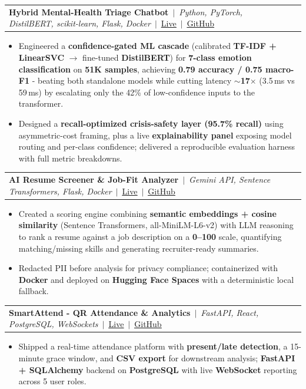 \documentclass[letterpaper,9pt]{article}
\makeatletter
\newcommand{\resumeItem}[1]{%
  \item\scriptsize{#1}%
}
\newcommand{\resumeProjectHeading}[1]{%
  \vspace{0pt}\item
  \begin{tabular*}{1.0\textwidth}{l@{\extracolsep{\fill}}r}
    \scriptsize #1\\
  \end{tabular*}\vspace{-3pt}%
}
\newcommand{\resumeItemListStart}{\begin{itemize}[leftmargin=0.15in,itemsep=1pt,topsep=1pt,parsep=0pt]}
\newcommand{\resumeItemListEnd}{\end{itemize}\vspace{0pt}}
\makeatother
\begin{document}
  \resumeProjectHeading
    {\textbf{Hybrid Mental-Health Triage Chatbot}~$|$~\emph{Python, PyTorch, DistilBERT, scikit-learn, Flask, Docker}~$|$~\href{https://hybrid-chatbot-o0s2.onrender.com}{\underline{Live}}~$|$~\href{https://github.com/afrin2315/hybrid_chatbot}{\underline{GitHub}}}
  \resumeItemListStart
    \resumeItem{Engineered a \textbf{confidence-gated ML cascade} (calibrated \textbf{TF-IDF + LinearSVC} $\rightarrow$ fine-tuned \textbf{DistilBERT}) for \textbf{7-class emotion classification} on \textbf{51K samples}, achieving \textbf{0.79 accuracy / 0.75 macro-F1} - beating both standalone models while cutting latency \textbf{$\sim$17$\times$} (3.5\,ms vs 59\,ms) by escalating only the 42\% of low-confidence inputs to the transformer.}
    \resumeItem{Designed a \textbf{recall-optimized crisis-safety layer (95.7\% recall)} using asymmetric-cost framing, plus a live \textbf{explainability panel} exposing model routing and per-class confidence; delivered a reproducible evaluation harness with full metric breakdowns.}
  \resumeItemListEnd

  \resumeProjectHeading
    {\textbf{AI Resume Screener \& Job-Fit Analyzer}~$|$~\emph{Gemini API, Sentence Transformers, Flask, Docker}~$|$~\href{https://huggingface.co/spaces/Afrin18/ai-resume-screener}{\underline{Live}}~$|$~\href{https://github.com/afrin2315/ai-resume-screener}{\underline{GitHub}}}
  \resumeItemListStart
    \resumeItem{Created a scoring engine combining \textbf{semantic embeddings + cosine similarity} (Sentence Transformers, all-MiniLM-L6-v2) with LLM reasoning to rank a resume against a job description on a \textbf{0--100} scale, quantifying matching/missing skills and generating recruiter-ready summaries.}
    \resumeItem{Redacted PII before analysis for privacy compliance; containerized with \textbf{Docker} and deployed on \textbf{Hugging Face Spaces} with a deterministic local fallback.}
  \resumeItemListEnd

  \resumeProjectHeading
    {\textbf{SmartAttend - QR Attendance \& Analytics}~$|$~\emph{FastAPI, React, PostgreSQL, WebSockets}~$|$~\href{https://smart-attend-beryl.vercel.app}{\underline{Live}}~$|$~\href{https://github.com/afrin2315/smart_attend}{\underline{GitHub}}}
  \resumeItemListStart
    \resumeItem{Shipped a real-time attendance platform with \textbf{present/late detection}, a 15-minute grace window, and \textbf{CSV export} for downstream analysis; \textbf{FastAPI + SQLAlchemy} backend on \textbf{PostgreSQL} with live \textbf{WebSocket} reporting across 5 user roles.}
  \resumeItemListEnd
\end{document}
